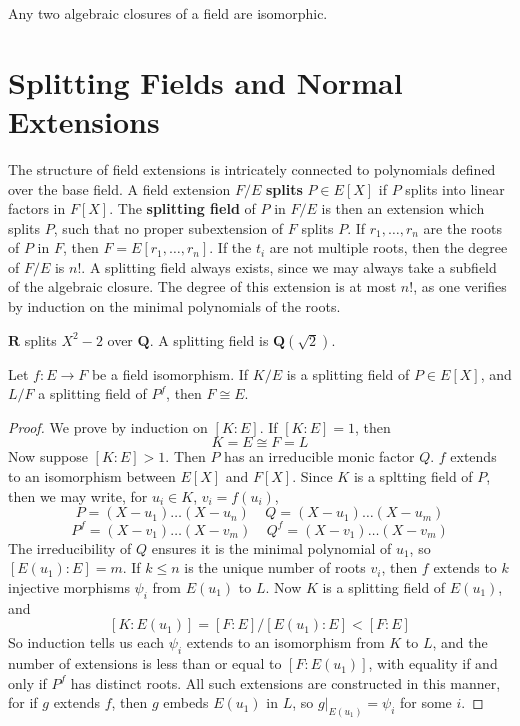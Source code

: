 \begin{corollary}
    Any two algebraic closures of a field are isomorphic.
\end{corollary}






\section{Splitting Fields and Normal Extensions}

The structure of field extensions is intricately connected to polynomials defined over the base field. A field extension $F/E$ {\bf splits} $P \in E[X]$ if $P$ splits into linear factors in $F[X]$. The {\bf splitting field} of $P$ in $F/E$ is then an extension which splits $P$, such that no proper subextension of $F$ splits $P$. If $r_1, \dots, r_n$ are the roots of $P$ in $F$, then $F = E[r_1, \dots, r_n]$. If the $t_i$ are not multiple roots, then the degree of $F/E$ is $n!$. A splitting field always exists, since we may always take a subfield of the algebraic closure. The degree of this extension is at most $n!$, as one verifies by induction on the minimal polynomials of the roots.

\begin{example}
    $\mathbf{R}$ splits $X^2 - 2$ over $\mathbf{Q}$. A splitting field is $\mathbf{Q}(\sqrt{2})$.
\end{example}

\begin{theorem}
    Let $f: E \to F$ be a field isomorphism. If $K/E$ is a splitting field of $P \in E[X]$, and $L/F$ a splitting field of $P^f$, then $F \cong E$.
\end{theorem}
\begin{proof}
    We prove by induction on $[K:E]$. If $[K:E] = 1$, then
    \[ K = E \cong F = L \]
    Now suppose $[K:E] > 1$. Then $P$ has an irreducible monic factor $Q$. $f$ extends to an isomorphism between $E[X]$ and $F[X]$. Since $K$ is a spltting field of $P$, then we may write, for $u_i \in K$, $v_i = f(u_i)$,
    \[ P = (X - u_1) \dots (X - u_n)\ \ \ \ \ Q = (X - u_1) \dots (X - u_m) \]
    \[ P^f = (X - v_1) \dots (X - v_m)\ \ \ \ \ Q^f = (X - v_1) \dots (X - v_m) \]
    The irreducibility of $Q$ ensures it is the minimal polynomial of $u_1$, so $[E(u_1): E] = m$. If $k \leq n$ is the unique number of roots $v_i$, then $f$ extends to $k$ injective morphisms $\psi_i$ from $E(u_1)$ to $L$. Now $K$ is a splitting field of $E(u_1)$, and
    \[ [K:E(u_1)] = [F:E]/[E(u_1):E] < [F:E] \]
    So induction tells us each $\psi_i$ extends to an isomorphism from $K$ to $L$, and the number of extensions is less than or equal to $[F:E(u_1)]$, with equality if and only if $P^f$ has distinct roots. All such extensions are constructed in this manner, for if $g$ extends $f$, then $g$ embeds $E(u_1)$ in $L$, so $g|_{E(u_1)} = \psi_i$ for some $i$.
\end{proof}

